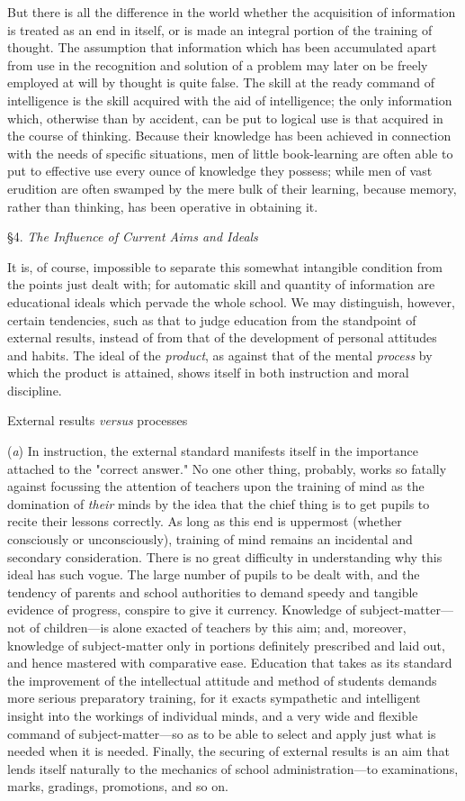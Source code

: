 \documentclass[letterpaper]{book}
\begin{document}
But there is all the difference in the world whether the acquisition of
information is treated as an end in itself, or is made an integral
portion of the training of thought. The assumption that information
which
has
been accumulated apart from use in the recognition and solution of a
problem may later on be freely employed at will by thought is quite
false. The skill at the ready command of intelligence is the skill
acquired with the aid of intelligence; the only information which,
otherwise than by accident, can be put to logical use is that acquired
in the course of thinking. Because their knowledge has been achieved in
connection with the needs of specific situations, men of little
book-learning are often able to put to effective use every ounce of
knowledge they possess; while men of vast erudition are often swamped by
the mere bulk of their learning, because memory, rather than thinking,
has been operative in obtaining it.

§4. \emph{The Influence of Current Aims and Ideals}

It is, of course, impossible to separate this somewhat intangible
condition from the points just dealt with; for automatic skill and
quantity of information are educational ideals which pervade the whole
school. We may distinguish, however, certain tendencies, such as that to
judge education from the standpoint of external results, instead of from
that of the development of personal attitudes and habits. The ideal of
the \emph{product}, as against that of the mental \emph{process} by
which the product is attained, shows itself in both instruction and
moral discipline.

External results \emph{versus} processes

(\emph{a}) In instruction, the external standard manifests itself in the
importance attached to the "correct answer." No one other thing,
probably, works so fatally against focussing the attention of teachers
upon the training of mind as the domination of \emph{their} minds by the
idea that the chief thing is to get pupils to recite their lessons
correctly.
As long as this end is uppermost (whether consciously or unconsciously),
training of mind remains an incidental and secondary consideration.
There is no great difficulty in understanding why this ideal has such
vogue. The large number of pupils to be dealt with, and the tendency of
parents and school authorities to demand speedy and tangible evidence of
progress, conspire to give it currency. Knowledge of
subject-matter---not of children---is alone exacted of teachers by this
aim; and, moreover, knowledge of subject-matter only in portions
definitely prescribed and laid out, and hence mastered with comparative
ease. Education that takes as its standard the improvement of the
intellectual attitude and method of students demands more serious
preparatory training, for it exacts sympathetic and intelligent insight
into the workings of individual minds, and a very wide and flexible
command of subject-matter---so as to be able to select and apply just
what is needed when it is needed. Finally, the securing of external
results is an aim that lends itself naturally to the mechanics of school
administration---to examinations, marks, gradings, promotions, and so
on.
\end{document}
